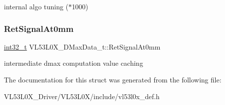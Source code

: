 internal algo tuning ($\ast$1000) \mbox{\label{structVL53L0X__DMaxData__t_aa796669242ee9360ec0b538d9b83678d}} 
\subsubsection{\texorpdfstring{Ret\+Signal\+At0mm}{RetSignalAt0mm}}
{\footnotesize\ttfamily \hyperlink{vl53l0x__types_8h_a32f2e37ee053cf2ce8ca28d1f74630e5}{int32\+\_\+t} V\+L53\+L0\+X\+\_\+\+D\+Max\+Data\+\_\+t\+::\+Ret\+Signal\+At0mm}

intermediate dmax computation value caching 

The documentation for this struct was generated from the following file\+:\begin{DoxyCompactItemize}
\item 
V\+L53\+L0\+X\+\_\+\+Driver/\+V\+L53\+L0\+X/include/vl53l0x\+\_\+def.\+h\end{DoxyCompactItemize}
